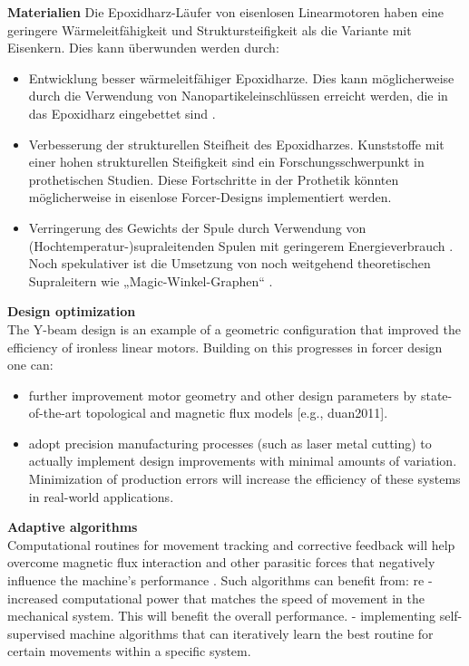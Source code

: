 \documentclass[
  oneside]{book}
\providecommand{\tightlist}{%
  \setlength{\itemsep}{0pt}\setlength{\parskip}{0pt}}
\begin{document}
\textbf{Materialien}
Die Epoxidharz-Läufer von eisenlosen Linearmotoren haben eine geringere Wärmeleitfähigkeit und Struktursteifigkeit als die Variante mit Eisenkern. Dies kann überwunden werden durch:

\begin{itemize}
\tightlist
\item
  Entwicklung besser wärmeleitfähiger Epoxidharze. Dies kann möglicherweise durch die Verwendung von Nanopartikeleinschlüssen erreicht werden, die in das Epoxidharz eingebettet sind \citep{fu2010}.
\item
  Verbesserung der strukturellen Steifheit des Epoxidharzes. Kunststoffe mit einer hohen strukturellen Steifigkeit sind ein Forschungsschwerpunkt in prothetischen Studien. Diese Fortschritte in der Prothetik könnten möglicherweise in eisenlose Forcer-Designs implementiert werden.
\item
  Verringerung des Gewichts der Spule durch Verwendung von (Hochtemperatur-)supraleitenden Spulen mit geringerem Energieverbrauch \citep{palka2021}. Noch spekulativer ist die Umsetzung von noch weitgehend theoretischen Supraleitern wie „Magic-Winkel-Graphen`` \citep{cao2018}.
\end{itemize}

\textbf{Design optimization}\\
The Y-beam design is an example of a geometric configuration that improved the efficiency of ironless linear motors. Building on this progresses in forcer design one can:

\begin{itemize}
\tightlist
\item
  further improvement motor geometry and other design parameters by state-of-the-art topological and magnetic flux models {[}e.g., duan2011{]}.
\item
  adopt precision manufacturing processes (such as laser metal cutting) to actually implement design improvements with minimal amounts of variation. Minimization of production errors will increase the efficiency of these systems in real-world applications.
\end{itemize}

\textbf{Adaptive algorithms}\\
Computational routines for movement tracking and corrective feedback will help overcome magnetic flux interaction and other parasitic forces that negatively influence the machine's performance \citep{nguyen2016}. Such algorithms can benefit from:
re
- increased computational power that matches the speed of movement in the mechanical system. This will benefit the overall performance.
- implementing self-supervised machine algorithms that can iteratively learn the best routine for certain movements within a specific system.
\end{document}
